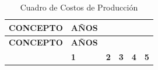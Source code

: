 \documentclass[
  stu,
  floatsintext,
  longtable,
  a4paper,
  nolmodern,
  notxfonts,
  notimes,
  colorlinks=true,linkcolor=blue,citecolor=blue,urlcolor=blue]{apa7}
\begin{document}
\begin{longtable}[]{@{}
  >{\raggedright\arraybackslash}p{}
  >{\centering\arraybackslash}p{}
  >{\centering\arraybackslash}p{}
  >{\centering\arraybackslash}p{}
  >{\centering\arraybackslash}p{}
  >{\centering\arraybackslash}p{}@{}}
\caption{Cuadro de Costos de Producción}\tabularnewline
\toprule\noalign{}
\begin{minipage}[b]{\linewidth}\raggedright
\textbf{CONCEPTO}
\end{minipage} & \begin{minipage}[b]{\linewidth}\centering
\textbf{AÑOS}
\end{minipage} & \begin{minipage}[b]{\linewidth}\centering
\end{minipage} & \begin{minipage}[b]{\linewidth}\centering
\end{minipage} & \begin{minipage}[b]{\linewidth}\centering
\end{minipage} & \begin{minipage}[b]{\linewidth}\centering
\end{minipage} \\
\midrule\noalign{}
\endfirsthead
\toprule\noalign{}
\begin{minipage}[b]{\linewidth}\raggedright
\textbf{CONCEPTO}
\end{minipage} & \begin{minipage}[b]{\linewidth}\centering
\textbf{AÑOS}
\end{minipage} & \begin{minipage}[b]{\linewidth}\centering
\end{minipage} & \begin{minipage}[b]{\linewidth}\centering
\end{minipage} & \begin{minipage}[b]{\linewidth}\centering
\end{minipage} & \begin{minipage}[b]{\linewidth}\centering
\end{minipage} \\
\midrule\noalign{}
\endhead
\bottomrule\noalign{}
\endlastfoot
& \textbf{1} & \textbf{2} & \textbf{3} & \textbf{4} & \textbf{5} \\

\end{longtable}
\end{document}
